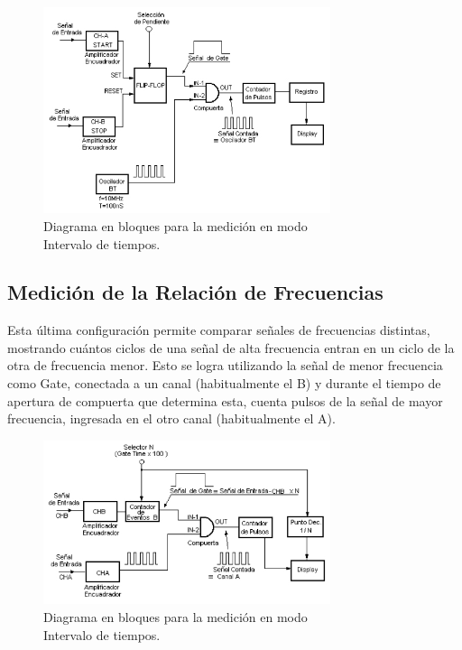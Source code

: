 \documentclass{article}
\begin{document}
\newpage
\begin{figure}[h]
	\centering
	\includegraphics[width=0.75\textwidth]{images/05-diagrama-en-bloques-modo-intervalo-tiempos.jpg}
	\medskip
	\caption{Diagrama en bloques para la medición en modo\\ Intervalo de tiempos.}
\end{figure}
\bigskip\bigskip

	
	
	


\subsection{Medición de la Relación de Frecuencias} 
\medskip

	Esta última configuración permite comparar señales de frecuencias distintas, mostrando cuántos ciclos de una señal de alta frecuencia entran en un ciclo de la otra de frecuencia menor. Esto se logra utilizando la señal de menor frecuencia como Gate, conectada a un canal (habitualmente el B) y durante el tiempo de apertura de compuerta que determina esta, cuenta pulsos de la señal de mayor frecuencia, ingresada en el otro canal (habitualmente el A).
\bigskip\bigskip


\begin{figure}[h]
	\centering
	\includegraphics[width=0.75\textwidth]{images/06-diagrama-en-bloques-modo-relacion-frecuencias.jpg}
	\medskip
	\caption{Diagrama en bloques para la medición en modo\\ Intervalo de tiempos.}
\end{figure}
\bigskip\bigskip
\end{document}
